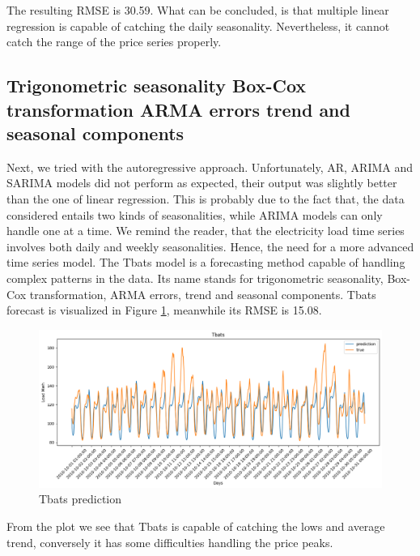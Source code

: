 The resulting RMSE is 30.59.
What can be concluded, is that multiple linear regression is capable of catching the daily seasonality. Nevertheless, it cannot catch the range of the price series properly.

\subsection{Trigonometric seasonality Box-Cox transformation ARMA errors trend and seasonal components}
Next, we tried with the autoregressive approach. Unfortunately, AR, ARIMA and SARIMA models did not perform as expected, their output was slightly better than the one of linear regression. This is probably due to the fact that, the data considered entails two kinds of seasonalities, while ARIMA models can only handle one at a time. We remind the reader, that the electricity load time series involves both daily and weekly seasonalities. Hence, the need for a more advanced time series model. The Tbats \cite{de2011forecasting} model is a forecasting method capable of handling complex patterns in the data. Its name stands for trigonometric seasonality, Box-Cox transformation, ARMA errors, trend and seasonal components. 
Tbats forecast is visualized in Figure \ref{fig:tbats_price}, meanwhile its RMSE is 15.08.
\begin{figure}[!h]
    \includegraphics[width=\textwidth]{images/tbats_price.png}
    \caption{Tbats prediction}
    \label{fig:tbats_price}
\end{figure}
From the plot we see that Tbats is capable of catching the lows and average trend, conversely it has some difficulties handling the price peaks.

